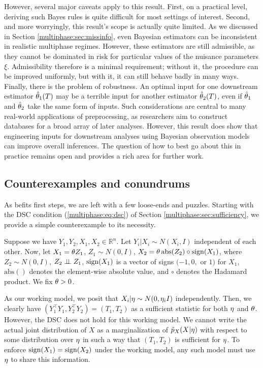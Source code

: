 However, several major caveats apply to this result.
First, on a practical level, deriving such Bayes rules is quite difficult for most settings of interest.
%
Second, and more worryingly, this result's scope is actually quite limited.
As we discussed in Section \ref{multiphase:sec:missinfo}, even Bayesian estimators can be inconsistent in realistic multiphase regimes.
However, these estimators are still admissible, as they cannot be dominated in risk for particular values of the nuisance parameters $\xi$.
Admissibility therefore  is  a minimal requirement; without it, the procedure can be improved uniformly, but with it, it can still behave badly in many ways. Finally, there is the problem of robustness.
An optimal input for one downstream estimator $\hat{\theta}_1(T)$ may be a terrible input for another estimator $\hat{\theta}_2(T)$, even if $\hat{\theta}_1$ and $\hat{\theta}_2$ take the same form of inputs.
Such considerations are central to many real-world applications of preprocessing, as researchers aim to construct databases for a broad array of later analyses.
%
However, this result does show that engineering inputs for downstream analyses using Bayesian observation models can improve overall inferences.
The question of how to best go about this in practice remains open and provides a rich area for further work.

\subsection{Counterexamples and conundrums}
\label{multiphase:sec:counterexamples}

As befits first steps, we are left with a few loose-ends and puzzles.
Starting with the DSC condition (\ref{multiphase:eq:dsc}) of Section \ref{multiphase:sec:sufficiency}, we provide a  simple counterexample to its necessity.

Suppose we have $Y_1,  Y_2,  X_1,  X_2 \in \mathbb{R}^n$. Let $ Y_i |  X_i \sim N(X_i, I)$ independent of each other.
Now, let $X_1 = \theta Z_1$, $Z_1 \sim N(0, I)$, $X_2 = \theta \, \mathrm{abs}(Z_2) \circ \operatorname{sign}(X_1)$, where $Z_2 \sim N(0, I)$, $Z_2 \perp\!\!\!\perp Z_1$, $\operatorname{sign}(X_1)$ is a vector of signs $(-1, 0,$ or $1)$ for $X_1$, $\mathrm{abs}()$ denotes the element-wise absolute value, and $\circ$ denotes the Hadamard product.
We fix $\theta > 0$.

As our working model, we posit that $X_i |\eta \sim N(0, \eta_i I)$ independently.
Then, we clearly have $(Y_1^\top Y_1, Y_2^\top Y_2) = (T_1, T_2)$ as a sufficient statistic for both $\eta$ and $\theta$.
However, the DSC does not hold for this working model.
We cannot write the actual joint distribution of $X$ as a marginalization of $\tilde{p}_X(X |\eta)$ with respect to some distribution over $\eta$ in such a way that $(T_1, T_2)$ is sufficient for $\eta$.
To enforce $\operatorname{sign}(X_1) = \operatorname{sign}(X_2)$ under the working model, any such model must use $\eta$ to share this information.

